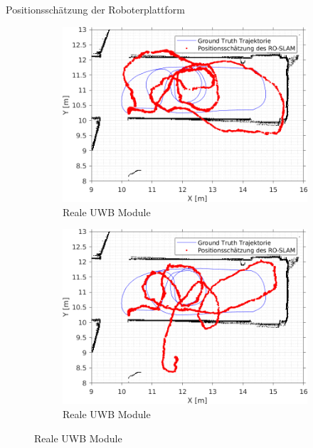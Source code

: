\documentclass{beamer}
\begin{document}
%
% 
%
\begin{frame}{Positionsschätzung der Roboterplattform}

	\begin{figure}
		\centering
		\begin{subfigure}{0.4\linewidth}
			\centering
			\includegraphics[width=\linewidth]{Record_2018-02-08-12-33-53_filtered_3_trajectory_pf}
			\caption{Reale UWB Module}
		\end{subfigure}
		\hfill
		\begin{subfigure}{0.4\linewidth}
			\centering
			\includegraphics[width=\linewidth]{Record_2018-02-08-12-33-53_filtered_1_trajectory_pf}
			\caption{Reale UWB Module}
		\end{subfigure}

\end{figure}
\end{frame}
\end{document}
